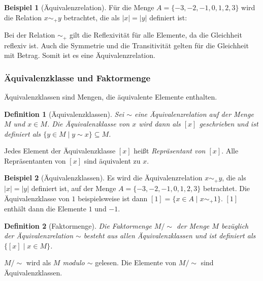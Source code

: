 \documentclass[12pt,a4paper, usenames, dvipsnames]{article}
\theoremstyle{mystyle}
\newtheorem{definition}{Definition}
\theoremstyle{definition}
\newtheorem{bsp}{Beispiel}[definition]
\begin{document}
\begin{bsp}[Äquivalenzrelation]
Für die Menge $A=\{ -3, -2, -1, 0, 1, 2, 3 \}$ wird die Relation $x \sim_+ y$ betrachtet, die als $|x| =|y|$ definiert ist:

Bei der Relation $\sim_+$ gilt die Reflexivität für alle Elemente, da die Gleichheit reflexiv ist. Auch die Symmetrie und die Transitivität gelten für die Gleichheit mit Betrag. Somit ist es eine Äquivalenzrelation. 


\end{bsp}

\subsubsection*{Äquivalenzklasse und Faktormenge} 
\label{Abschnitt_FaktormengenUndÄquivalenzklasse}

Äquivalenzklassen sind Mengen, die äquivalente Elemente enthalten.

\begin{definition}[Äquivalenzklassen]

Sei $ \sim $ eine Äquivalenzrelation auf der Menge $M$ und $x \in M$. Die Äquivalenzklasse von $x$ wird dann als $[x]$ geschrieben und ist definiert als $\{y \in M \mid y \sim x\} \subseteq M$.  

\end{definition}

Jedes Element der Äquivalenzklasse $[x]$ heißt \textit{Repräsentant von $[x]$}. Alle Repräsentanten von $[x]$ sind äquivalent zu $x$.

\begin{bsp}[Äquivalenzklassen]
Es wird die Äquivalenzrelation $x \sim_+ y$, die als $|x| =|y|$ definiert ist, auf der Menge $A=\{ -3, -2, -1, 0, 1, 2, 3 \}$ betrachtet. Die Äquivalenzklasse von $1$ beispielsweise ist dann $[1] = \{x \in A \mid x \sim_+ 1\}$. $[1]$ enthält dann die Elemente $1$ und $-1$.

\end{bsp}

\begin{definition}[Faktormenge]

Die Faktormenge $M / \sim $ der Menge $M$ bezüglich der Äquivalenzrelation $\sim$ besteht aus allen Äquivalenzklassen und ist definiert als $\{ [x] \mid x \in M \}$.

\end{definition}

$M / \sim $ wird als \textit{$M$ modulo $\sim$} gelesen. Die Elemente von $M / \sim $ sind Äquivalenzklassen.
\end{document}
